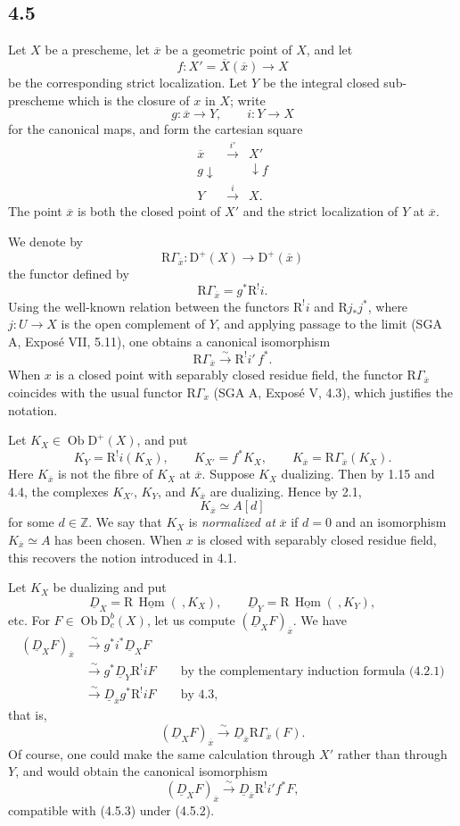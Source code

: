 \documentclass[12pt]{article}
\newcommand{\ZZ}{\mathbb Z}
\newcommand{\Hom}{\operatorname{Hom}}
\newcommand{\ob}{\operatorname{Ob}}
\newcommand{\D}{\mathrm D}
\newcommand{\R}{\mathrm R}
\newcommand{\ol}[1]{\overline{#1}}
\begin{document}
\subsection*{4.5}
Let $X$ be a prescheme, let $\ol x$ be a geometric point of $X$, and let
\[
   f:X'=\ol X(\ol x)\longrightarrow X
\]
be the corresponding strict localization. Let $Y$ be the integral closed sub-prescheme which is the closure of $x$ in $X$; write
\[
   g:\ol x\longrightarrow Y,
   \qquad i:Y\longrightarrow X
\]
for the canonical maps, and form the cartesian square
\[
\begin{array}{ccc}
\ol x&\xrightarrow{i'}&X'\\
\scriptstyle g\downarrow&&\downarrow\scriptstyle f\\
Y&\xrightarrow{i}&X.
\end{array}
\]
The point $\ol x$ is both the closed point of $X'$ and the strict localization of $Y$ at $\ol x$.

We denote by
\[
   \R\Gamma_{\ol x}:\D^+(X)\longrightarrow\D^+(\ol x)
\]
the functor defined by
\[
   \R\Gamma_{\ol x}=g^*\R^!i.\tag{4.5.1}
\]
Using the well-known relation between the functors $\R^!i$ and $\R j_*j^*$, where $j:U\to X$ is the open complement of $Y$, and applying passage to the limit (SGA A, Exposé VII, 5.11), one obtains a canonical isomorphism
\[
   \R\Gamma_{\ol x}\xrightarrow{\sim}\R^!i'\,f^*.\tag{4.5.2}
\]
When $x$ is a closed point with separably closed residue field, the functor $\R\Gamma_{\ol x}$ coincides with the usual functor $\R\Gamma_x$ (SGA A, Exposé V, 4.3), which justifies the notation.

Let $K_X\in\ob\D^+(X)$, and put
\[
   K_Y=\R^!i(K_X),\qquad K_{X'}=f^*K_X,
   \qquad K_{\ol x}=\R\Gamma_{\ol x}(K_X).
\]
Here $K_{\ol x}$ is not the fibre of $K_X$ at $\ol x$. Suppose $K_X$ dualizing. Then by 1.15 and 4.4, the complexes $K_{X'}$, $K_Y$, and $K_{\ol x}$ are dualizing. Hence by 2.1,
\[
   K_{\ol x}\simeq A[d]
\]
for some $d\in\ZZ$. We say that $K_X$ is \emph{normalized at} $\ol x$ if $d=0$ and an isomorphism $K_{\ol x}\simeq A$ has been chosen. When $x$ is closed with separably closed residue field, this recovers the notion introduced in 4.1.

Let $K_X$ be dualizing and put
\[
   \underline D_X=\R\,\underline{\Hom}(\ ,K_X),\qquad
   \underline D_Y=\R\,\underline{\Hom}(\ ,K_Y),
\]
etc. For $F\in\ob\D_c^b(X)$, let us compute $(\underline D_XF)_{\ol x}$. We have
\[
\begin{aligned}
(\underline D_XF)_{\ol x}
&\xrightarrow{\sim}g^*i^*\underline D_XF\\
&\xrightarrow{\sim}g^*\underline D_Y\R^!iF
   \qquad\text{by the complementary induction formula (4.2.1)}\\
&\xrightarrow{\sim}\underline D_{\ol x}g^*\R^!iF
   \qquad\text{by 4.3},
\end{aligned}
\]
that is,
\[
   (\underline D_XF)_{\ol x}
      \xrightarrow{\sim}\underline D_{\ol x}\R\Gamma_{\ol x}(F).\tag{4.5.3}
\]
Of course, one could make the same calculation through $X'$ rather than through $Y$, and would obtain the canonical isomorphism
\[
   (\underline D_XF)_{\ol x}
      \xrightarrow{\sim}\underline D_{\ol x}\R^!i' f^*F,
\]
compatible with (4.5.3) under (4.5.2).
\end{document}
